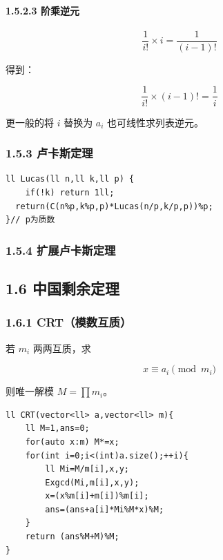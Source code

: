 \documentclass[UTF8,a4paper,11pt]{ctexart}
\begin{document}
\paragraph*{1.5.2.3 阶乘逆元}

\[
\frac{1}{i!}\times i=\frac{1}{(i-1)!}
\]

得到：

\[
\frac{1}{i!}\times (i-1)!=\frac{1}{i}
\]

更一般的将 $i$ 替换为 $a_i$ 也可线性求列表逆元。

\subsubsection*{1.5.3 卢卡斯定理}

\begin{Verbatim}[fontsize=\small,frame=single,breaklines=true,breakanywhere=true]
ll Lucas(ll n,ll k,ll p) {
    if(!k) return 1ll;
  return(C(n%p,k%p,p)*Lucas(n/p,k/p,p))%p;
}// p为质数
\end{Verbatim}
\subsubsection*{1.5.4 扩展卢卡斯定理}

\subsection*{1.6 中国剩余定理}

\subsubsection*{1.6.1 CRT（模数互质）}

若 $m_i$ 两两互质，求

\[
x\equiv a_i\pmod{m_i}
\]

则唯一解模 $M=\prod m_i$。

\begin{Verbatim}[fontsize=\small,frame=single,breaklines=true,breakanywhere=true]
ll CRT(vector<ll> a,vector<ll> m){
    ll M=1,ans=0;
    for(auto x:m) M*=x;
    for(int i=0;i<(int)a.size();++i){
        ll Mi=M/m[i],x,y;
        Exgcd(Mi,m[i],x,y);
        x=(x%m[i]+m[i])%m[i];
        ans=(ans+a[i]*Mi%M*x)%M;
    }
    return (ans%M+M)%M;
}
\end{Verbatim}
\end{document}
